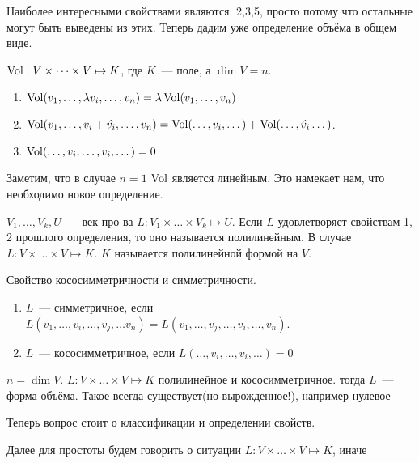 Наиболее интересными свойствами являются: 2,3,5, просто потому что остальные могут быть выведены из этих.
Теперь дадим уже определение объёма в общем виде.
\begin{definition}
    $\operatorname{Vol}: V\times \dots \times V \mapsto K$, где $K$~--- поле, а $\dim V = n$.
    \begin{enumerate}
        \item $\operatorname{Vol}(v_1,\dots, \lambda v_i, \dots, v_n) = \lambda \operatorname{Vol}(v_1,\dots, v_n)$
        \item $\operatorname{Vol}(v_1,\dots, v_i + \hat{v_i}, \dots, v_n) = 
            \operatorname{Vol}(\dots, v_i, \dots ) + \operatorname{Vol}(\dots, \hat{v_i} \dots)$.
        \item $\operatorname{Vol}(\dots, v_i, \dots, v_i, \dots) = 0$
    \end{enumerate}
\end{definition}
\begin{remark}
    Заметим, что в случае $n = 1$ $\operatorname{Vol}$ является линейным. Это намекает нам, что необходимо
    новое определение.
\end{remark}
\begin{definition}
    $V_1,\dots, V_k, U$~--- век про-ва $L: V_1\times\dots\times V_k\mapsto U$.
    Если $L$ удовлетворяет свойствам 1, 2 прошлого определения, то оно называется полилинейным.
    В случае $L: V\times\dots\times V\mapsto K$. $K$ называется полилинейной формой на $V$.
\end{definition}
\begin{definition}
    Свойство кососимметричности и симметричности.
     \begin{enumerate}
         \item $L$~--- симметричное, если $L(v_1,\dots, v_i, \dots, v_j, \dots v_n) = L(v_1,\dots, v_j,\dots, v_i,\dots, v_n)$.
         \item $L$~--- кососимметричное, если $L(\dots, v_i, \dots, v_i, \dots) = 0$
    \end{enumerate}
\end{definition}
\begin{definition}
    $n = \dim V$. $L: V\times\dots\times V \mapsto K$ полилинейное и кососимметричное.
    тогда $L$~--- форма объёма. Такое всегда существует(но вырожденное!), например нулевое
\end{definition}
\begin{motivation}
    Теперь вопрос стоит о классификации и определении свойств.
\end{motivation}
Далее для простоты будем говорить о ситуации $L: V\times\dots\times V\mapsto K$, иначе

